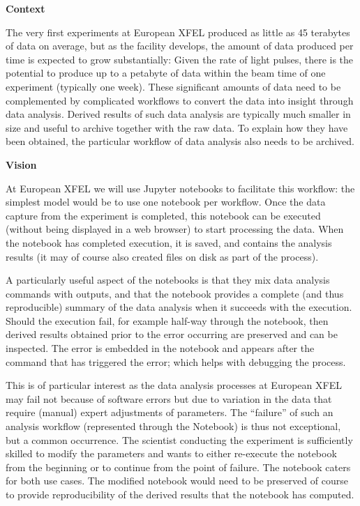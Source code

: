 \begin{task}[
  title=Reproducible photon science workflows at European XFEL,
  id=reproducibility-xfel,
  lead=XFEL,
  PM=38,
  wphases={7-48},
  partners={INSERM,SRL,UPSUD,EGI}
  ]
  \textbf{Context}

  The very first experiments at European XFEL
  produced as little as 45 terabytes of data on average, but as the
  facility develops, the amount of data produced per time is expected
  to grow substantially: Given the rate of light pulses, there is the
  potential to produce up to a petabyte of data within the beam time
  of one experiment (typically one week). These significant amounts of
  data need to be complemented by complicated workflows to convert the
  data into insight through data analysis. Derived results of such
  data analysis are typically much smaller in size and useful to
  archive together with the raw data. To explain how they have been
  obtained, the particular workflow of data analysis also needs to be
  archived.

  \medskip
  \textbf{Vision}

  At European XFEL we will use Jupyter notebooks to facilitate
  this workflow: the simplest model would be to use one notebook per
  workflow. Once the data capture from the experiment is completed,
  this notebook can be executed (without being displayed in a web
  browser) to start processing the data. When the notebook has
  completed execution, it is saved, and contains the analysis results
  (it may of course also created files on disk as part of the
  process).

  A particularly useful aspect of the notebooks is that they mix data
  analysis commands with outputs, and that the notebook provides a
  complete (and thus reproducible) summary of the data analysis when
  it succeeds with the execution. Should the execution fail, for
  example half-way through the notebook, then derived results obtained
  prior to the error occurring are preserved and can be inspected. The
  error is embedded in the notebook and appears after the command that
  has triggered the error; which helps with debugging the process.

  This is of particular interest as the data analysis processes at
  European XFEL may fail not because of software errors but due to
  variation in the data that require (manual) expert adjustments of
  parameters. The ``failure'' of such an analysis workflow
  (represented through the Notebook) is thus not exceptional, but a
  common occurrence. The scientist conducting the experiment is
  sufficiently skilled to modify the parameters and wants to either
  re-execute the notebook from the beginning or to continue from the
  point of failure. The notebook caters for both use cases. The
  modified notebook would need to be preserved of course to provide
  reproducibility of the derived results that the notebook has
  computed.


\end{task}
